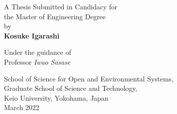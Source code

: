 \pagestyle{empty}
\begin{center}

\vspace{1cm}
\Large
{\bf \PAPERTITLE}

\vspace{2cm}

A Thesis Submitted in Candidacy for \\
the Master of Engineering Degree \\
by \\
{\bf Kosuke Igarashi}\\[.1in]

\vspace{1cm}

Under the guidance of
\\Professor {\it Iwao Sasase}\\

\vspace{1cm}

School of Science for Open and Environmental Systems, \\
Graduate School of Science and Technology, \\
Keio University, Yokohama, Japan \\
March 2022

\end{center}

